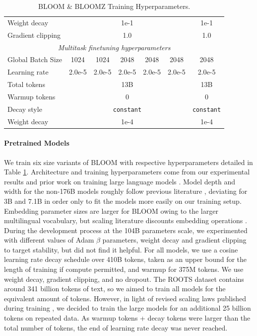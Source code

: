 \documentclass[twoside,11pt]{article}
\begin{document}
\begin{table}[ht]
\begin{center}
{\begin{tabular}{l|ccccc|c}
    Weight decay & \multicolumn{5}{c|}{1e-1} & 1e-1 \\ 
    Gradient clipping & \multicolumn{5}{c|}{1.0} & 1.0 \\
    \midrule
    \multicolumn{7}{c}{\emph{Multitask finetuning hyperparameters}} \\
    \midrule
    Global Batch Size  & 1024 & 1024 & 2048 & 2048 & 2048 & 2048 \\ 
    Learning rate & 2.0e-5 & 2.0e-5 & 2.0e-5 & 2.0e-5 & 2.0e-5 &  2.0e-5  \\ 
    Total tokens & \multicolumn{5}{c|}{13B} & 13B \\ 
    Warmup tokens & \multicolumn{5}{c|}{0} & 0 \\ 
    Decay style & \multicolumn{5}{c|}{\texttt{constant}} & \texttt{constant}
    \\     
    Weight decay & \multicolumn{5}{c|}{1e-4} & 1e-4 \\ 
    \end{tabular}
}
\caption{BLOOM \& BLOOMZ Training Hyperparameters.}
\label{table:hp}
\end{center}
\end{table}

\paragraph{Pretrained Models} We train six size variants of BLOOM with respective hyperparameters detailed in Table \ref{table:hp}. Architecture and training hyperparameters come from our experimental results \citep{scao2022what} and prior work on training large language models \citep{brown2020language,kaplan2020scaling}. Model depth and width for the non-176B models roughly follow previous literature \citep{brown2020language, zhang2022opt}, deviating for 3B and 7.1B in order only to fit the models more easily on our training setup. Embedding parameter sizes are larger for BLOOM owing to the larger multilingual vocabulary, but scaling literature discounts embedding operations \citep{kaplan2020scaling}. During the development process at the 104B parameters scale, we experimented with different values of Adam $\beta$ parameters, weight decay and gradient clipping to target stability, but did not find it helpful. For all models, we use a cosine learning rate decay schedule \citep{loschchilovcosinedecay} over 410B tokens, taken as an upper bound for the length of training if compute permitted, and warmup for 375M tokens. We use weight decay, gradient clipping, and no dropout. The ROOTS dataset contains around 341 billion tokens of text, so we aimed to train all models for the equivalent amount of tokens. However, in light of revised scaling laws published during training \citep{hoffmann2022training}, we decided to train the large models for an additional 25 billion tokens on repeated data. As warmup tokens + decay tokens were larger than the total number of tokens, the end of learning rate decay was never reached.
\end{document}
